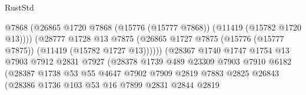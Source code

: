 \begin{lexlean}{RustStd}
\begin{coremodule}
                                            @7868
                                            (@26865
                                              @1720
                                              @7868
                                              (@15776 (@15777 @7868))
                                              (@11419 (@15782 @1720 @13))))
                                          (@28777
                                            @1728
                                            @13
                                            @7875
                                            (@26865
                                              @1727
                                              @7875
                                              (@15776 (@15777 @7875))
                                              (@11419 (@15782 @1727 @13))))))
                                      (@28367
                                        @1740
                                        @1747
                                        @1754
                                        @13
                                        @7903
                                        @7912
                                        @2831
                                        @7927
                                        (@28378
                                          @1739
                                          @489
                                          @23309
                                          @7903
                                          @7910
                                          @6182
                                          (@28387
                                            @1738
                                            @53
                                            @55
                                            @4647
                                            @7902
                                            @7909
                                            @2819
                                            @7883
                                            @2825
                                            @26843
                                            (@28386
                                              @1736
                                              @103
                                              @53
                                              @16
                                              @7899
                                              @2831
                                              @2844
                                              @2819

\end{coremodule}
\end{lexlean}
